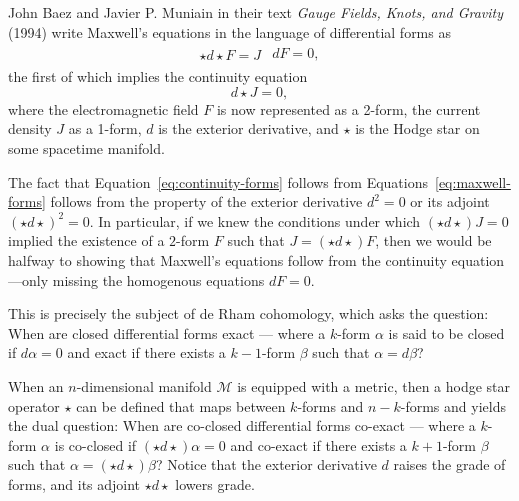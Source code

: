 \documentclass[twocolumn,notitlepage,nofootinbib,tightenlines]{revtex4-1}
\theoremstyle{definition}
\theoremstyle{remark}
\numberwithin{equation}{section}
\begin{document}
John Baez and Javier P. Muniain in their text \emph{Gauge Fields, Knots, and Gravity} (1994) write Maxwell's equations in the language of differential forms as
%
\begin{align}\label{eq:maxwell-forms}
    \begin{split}
        \star d \star F = J
    \end{split}
    \begin{split}
        d F = 0,
    \end{split}
\end{align}
%
the first of which implies the continuity equation
%
\begin{equation}\label{eq:continuity-forms}
    d \star J = 0,
\end{equation}
%
where the electromagnetic field $F$ is now represented as a 2-form, the current density $J$ as a 1-form, $d$ is the exterior derivative, and $\star$ is the Hodge star on some spacetime manifold.

The fact that Equation~\ref{eq:continuity-forms} follows from Equations~\ref{eq:maxwell-forms} follows from the property of the exterior derivative $d^2 = 0$ or its adjoint $(\star d \star)^2 = 0$.  In particular, if we knew the conditions under which $(\star d \star) J = 0$ implied the existence of a $2$-form $F$ such that $J = (\star d \star) F$, then we would be halfway to showing that Maxwell's equations follow from the continuity equation---only missing the homogenous equations $d F = 0$.

This is precisely the subject of de Rham cohomology, which asks the question: When are closed differential forms exact --- where a $k$-form $\alpha$ is said to be closed if $d \alpha = 0$ and exact if there exists a $k-1$-form $\beta$ such that $\alpha = d \beta$?

When an $n$-dimensional manifold $\mathcal{M}$ is equipped with a metric, then a hodge star operator $\star$ can be defined that maps between $k$-forms and $n-k$-forms and yields the dual question: When are co-closed differential forms co-exact --- where a $k$-form $\alpha$ is co-closed if $(\star d \star) \alpha = 0$ and co-exact if there exists a $k+1$-form $\beta$ such that $\alpha = (\star d \star) \beta$? Notice that the exterior derivative $d$ raises the grade of forms, and its adjoint $\star d \star$ lowers grade.
\end{document}
